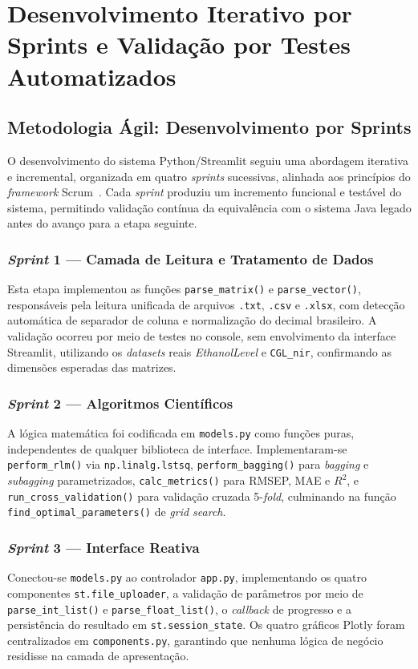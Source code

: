 \chapter{Desenvolvimento Iterativo por Sprints e Validação por Testes Automatizados}
\label{sec:sprints}

\section{Metodologia Ágil: Desenvolvimento por Sprints}

O desenvolvimento do sistema Python/Streamlit seguiu uma abordagem iterativa e
incremental, organizada em quatro \textit{sprints} sucessivas, alinhada aos
princípios do \textit{framework} Scrum~\cite{scrum2026}. Cada \textit{sprint}
produziu um incremento funcional e testável do sistema, permitindo validação
contínua da equivalência com o sistema Java legado antes do avanço para a
etapa seguinte.

\subsection{\textit{Sprint} 1 --- Camada de Leitura e Tratamento de Dados}
Esta etapa implementou as funções \texttt{parse\_matrix()} e
\texttt{parse\_vector()}, responsáveis pela leitura unificada de arquivos
\texttt{.txt}, \texttt{.csv} e \texttt{.xlsx}, com detecção automática de
separador de coluna e normalização do decimal brasileiro. A validação ocorreu
por meio de testes no console, sem envolvimento da interface Streamlit,
utilizando os \textit{datasets} reais \textit{EthanolLevel} e
\texttt{CGL\_nir}, confirmando as dimensões esperadas das matrizes.

\subsection{\textit{Sprint} 2 --- Algoritmos Científicos}
A lógica matemática foi codificada em \texttt{models.py} como funções puras,
independentes de qualquer biblioteca de interface. Implementaram-se
\texttt{perform\_rlm()} via \texttt{np.linalg.lstsq}, \texttt{perform\_bagging()}
para \textit{bagging} e \textit{subagging} parametrizados, \texttt{calc\_metrics()}
para RMSEP, MAE e $R^2$, e \texttt{run\_cross\_validation()} para validação
cruzada 5-\textit{fold}, culminando na função \texttt{find\_optimal\_parameters()}
de \textit{grid search}.

\subsection{\textit{Sprint} 3 --- Interface Reativa}
Conectou-se \texttt{models.py} ao controlador \texttt{app.py}, implementando os quatro
componentes \texttt{st.file\_uploader}, a validação de parâmetros por meio de
\texttt{parse\_int\_list()} e \texttt{parse\_float\_list()}, o \textit{callback}
de progresso e a persistência do resultado em \texttt{st.session\_state}. Os quatro gráficos Plotly foram centralizados em \texttt{components.py}, garantindo que nenhuma lógica de negócio residisse na camada de apresentação.

